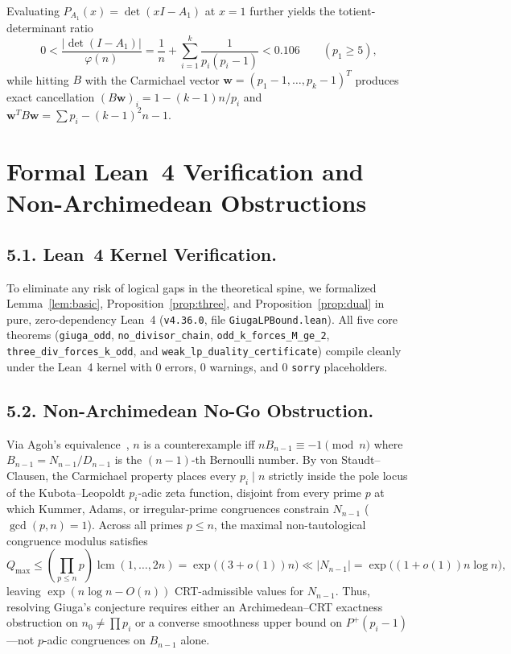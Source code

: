 \documentclass[11pt]{amsart}
\theoremstyle{definition}
\theoremstyle{remark}
\numberwithin{equation}{section}
\begin{document}
Evaluating $P_{A_1}(x) = \det(xI - A_1)$ at $x = 1$ further yields the totient-determinant ratio
\[
    0 < \frac{|\det(I - A_1)|}{\varphi(n)} = \frac{1}{n} + \sum_{i=1}^k \frac{1}{p_i(p_i - 1)} < 0.106 \qquad (p_1 \ge 5),
\]
while hitting $B$ with the Carmichael vector $\mathbf{w} = (p_1-1,\dots,p_k-1)^T$ produces exact cancellation $(B\mathbf{w})_i = 1 - (k-1)n/p_i$ and $\mathbf{w}^T B \mathbf{w} = \sum p_i - (k-1)^2 n - 1$.

\section{Formal Lean~4 Verification and Non-Archimedean Obstructions}

\subsection*{5.1. Lean~4 Kernel Verification.}
To eliminate any risk of logical gaps in the theoretical spine, we formalized Lemma~\ref{lem:basic}, Proposition~\ref{prop:three}, and Proposition~\ref{prop:dual} in pure, zero-dependency Lean~4 (\texttt{v4.36.0}, file \texttt{GiugaLPBound.lean}). All five core theorems (\texttt{giuga\_odd}, \texttt{no\_divisor\_chain}, \texttt{odd\_k\_forces\_M\_ge\_2}, \texttt{three\_div\_forces\_k\_odd}, and \texttt{weak\_lp\_duality\_certificate}) compile cleanly under the Lean~4 kernel with $0$ errors, $0$ warnings, and $0$ \texttt{sorry} placeholders.

\subsection*{5.2. Non-Archimedean No-Go Obstruction.}
Via Agoh's equivalence~\cite{Agoh1995}, $n$ is a counterexample iff $n B_{n-1} \equiv -1 \pmod{n}$ where $B_{n-1} = N_{n-1}/D_{n-1}$ is the $(n-1)$-th Bernoulli number. By von Staudt--Clausen, the Carmichael property places every $p_i \mid n$ strictly inside the pole locus of the Kubota--Leopoldt $p_i$-adic zeta function, disjoint from every prime $p$ at which Kummer, Adams, or irregular-prime congruences constrain $N_{n-1}$ ($\gcd(p, n) = 1$). Across all primes $p \le n$, the maximal non-tautological congruence modulus satisfies
\[
    Q_{\max} \le \left(\prod_{p \le n} p\right)\operatorname{lcm}(1,\dots,2n) = \exp\!\big((3 + o(1))n\big) \ll |N_{n-1}| = \exp\!\big((1 + o(1))n \log n\big),
\]
leaving $\exp(n \log n - O(n))$ CRT-admissible values for $N_{n-1}$. Thus, resolving Giuga's conjecture requires either an Archimedean--CRT exactness obstruction on $n_0 \neq \prod p_i$ or a converse smoothness upper bound on $P^+(p_i - 1)$—not $p$-adic congruences on $B_{n-1}$ alone.
\end{document}
